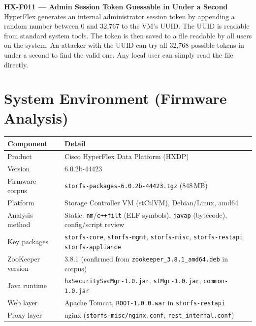 \documentclass[11pt,a4paper]{article}
\begin{document}
\medskip
\textbf{HX-F011 --- Admin Session Token Guessable in Under a Second}\\
HyperFlex generates an internal administrator session token by appending a
random number between 0 and 32,767 to the VM's UUID. The UUID is readable from
standard system tools. The token is then saved to a file readable by all users
on the system. An attacker with the UUID can try all 32,768 possible tokens in
under a second to find the valid one. Any local user can simply read the file
directly.

\section*{System Environment (Firmware Analysis)}

\begin{tabular}{@{}L{4.5cm}L{9.5cm}@{}}
\toprule
\textbf{Component} & \textbf{Detail} \\
\midrule
Product                 & Cisco HyperFlex Data Platform (HXDP) \\
Version                 & 6.0.2b-44423 \\
Firmware corpus         & \texttt{storfs-packages-6.0.2b-44423.tgz} (848\,MB) \\
Platform                & Storage Controller VM (stCtlVM), Debian/Linux, amd64 \\
Analysis method         & Static: \texttt{nm}/\texttt{c++filt} (ELF symbols), \texttt{javap} (bytecode), config/script review \\
Key packages            & \texttt{storfs-core}, \texttt{storfs-mgmt}, \texttt{storfs-misc}, \texttt{storfs-restapi}, \texttt{storfs-appliance} \\
ZooKeeper version       & 3.8.1 (confirmed from \texttt{zookeeper\_3.8.1\_amd64.deb} in corpus) \\
Java runtime            & \texttt{hxSecuritySvcMgr-1.0.jar}, \texttt{stMgr-1.0.jar}, \texttt{common-1.0.jar} \\
Web layer               & Apache Tomcat, \texttt{ROOT-1.0.0.war} in \texttt{storfs-restapi} \\
Proxy layer             & nginx (\texttt{storfs-misc/nginx.conf}, \texttt{rest\_internal.conf}) \\
\bottomrule
\end{tabular}

\bigskip
\end{document}
